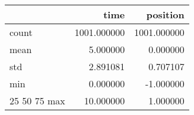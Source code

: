 \begin{tabular}{lrr}
\toprule
 & time & position \\
\midrule
count & 1001.000000 & 1001.000000 \\
mean & 5.000000 & 0.000000 \\
std & 2.891081 & 0.707107 \\
min & 0.000000 & -1.000000 \\
25%
50%
75%
max & 10.000000 & 1.000000 \\
\bottomrule
\end{tabular}
